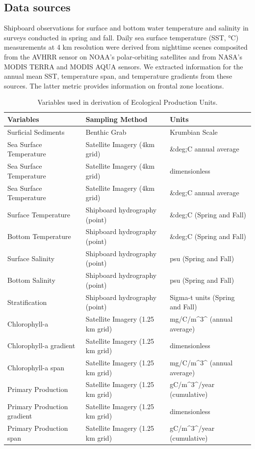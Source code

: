 \documentclass[
]{book}
\begin{document}
\hypertarget{data-sources-13}{%
\subsection{Data sources}\label{data-sources-13}}

Shipboard observations for surface and bottom water temperature and salinity in surveys conducted in spring and fall. Daily sea surface temperature (SST, °C) measurements at 4 km resolution were derived from nighttime scenes composited from the AVHRR sensor on NOAA's polar-orbiting satellites and from NASA's MODIS TERRA and MODIS AQUA sensors. We extracted information for the annual mean SST, temperature span, and temperature gradients from these sources. The latter metric provides information on frontal zone locations.

\begin{table}

\caption{\label{tab:epuinputs}Variables used in derivation of Ecological Production Units.}
\centering
\begin{tabular}[t]{lll}
\toprule
Variables & Sampling Method & Units\\
\midrule
Surficial Sediments & Benthic Grab & Krumbian Scale\\
Sea Surface Temperature & Satellite Imagery (4km grid) & \&deg;C annual average\\
Sea Surface Temperature & Satellite Imagery (4km grid) & dimensionless\\
Sea Surface Temperature & Satellite Imagery (4km grid) & \&deg;C annual average\\
Surface Temperature & Shipboard hydrography (point) & \&deg;C (Spring and Fall)\\
\addlinespace
Bottom Temperature & Shipboard hydrography (point) & \&deg;C (Spring and Fall)\\
Surface Salinity & Shipboard hydrography (point) & psu (Spring and Fall)\\
Bottom Salinity & Shipboard hydrography (point) & psu (Spring and Fall)\\
Stratification & Shipboard hydrography (point) & Sigma-t units (Spring and Fall)\\
Chlorophyll-a & Satellite Imagery (1.25 km grid) & mg/C/m\textasciicircum{}3\textasciicircum{} (annual average)\\
\addlinespace
Chlorophyll-a gradient & Satellite Imagery (1.25 km grid) & dimensionless\\
Chlorophyll-a span & Satellite Imagery (1.25 km grid) & mg/C/m\textasciicircum{}3\textasciicircum{} (annual average)\\
Primary Production & Satellite Imagery (1.25 km grid) & gC/m\textasciicircum{}3\textasciicircum{}/year (cumulative)\\
Primary Production gradient & Satellite Imagery (1.25 km grid) & dimensionless\\
Primary Production span & Satellite Imagery (1.25 km grid) & gC/m\textasciicircum{}3\textasciicircum{}/year (cumulative)\\
\bottomrule
\end{tabular}
\end{table}
\end{document}
